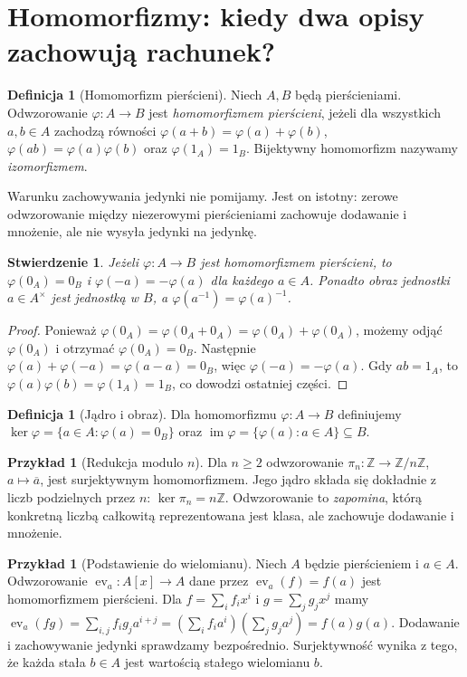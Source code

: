 \documentclass[11pt,a4paper,openany]{report}
\numberwithin{equation}{section}
\theoremstyle{plain}
\newtheorem{stwierdzenie}[twierdzenie]{Stwierdzenie}
\theoremstyle{definition}
\newtheorem{definicja}[twierdzenie]{Definicja}
\newtheorem{przyklad}[twierdzenie]{Przykład}
\theoremstyle{remark}
\newcommand{\Z}{\mathbb Z}
\newcommand{\im}{\operatorname{im}}
\newcommand{\kerf}{\operatorname{ker}}
\newcommand{\ev}{\operatorname{ev}}
\begin{document}
\section{Homomorfizmy: kiedy dwa opisy zachowują rachunek?}

\begin{definicja}[Homomorfizm pierścieni]
Niech $A,B$ będą pierścieniami. Odwzorowanie
$\varphi\colon A\to B$ jest \emph{homomorfizmem pierścieni}, jeżeli dla
wszystkich $a,b\in A$ zachodzą równości
$\varphi(a+b)=\varphi(a)+\varphi(b)$,
$\varphi(ab)=\varphi(a)\varphi(b)$ oraz $\varphi(1_A)=1_B$.
Bijektywny homomorfizm nazywamy \emph{izomorfizmem}.
\end{definicja}

Warunku zachowywania jedynki nie pomijamy. Jest on istotny:
zerowe odwzorowanie między niezerowymi pierścieniami zachowuje dodawanie
i mnożenie, ale nie wysyła jedynki na jedynkę.

\begin{stwierdzenie}
Jeżeli $\varphi\colon A\to B$ jest homomorfizmem pierścieni, to
$\varphi(0_A)=0_B$ i $\varphi(-a)=-\varphi(a)$ dla każdego $a\in A$.
Ponadto obraz jednostki $a\in A^\times$ jest jednostką w $B$,
a $\varphi(a^{-1})=\varphi(a)^{-1}$.
\end{stwierdzenie}
\begin{proof}
Ponieważ $\varphi(0_A)=\varphi(0_A+0_A)
=\varphi(0_A)+\varphi(0_A)$, możemy odjąć $\varphi(0_A)$
i otrzymać $\varphi(0_A)=0_B$.
Następnie $\varphi(a)+\varphi(-a)=\varphi(a-a)=0_B$,
więc $\varphi(-a)=-\varphi(a)$.
Gdy $ab=1_A$, to $\varphi(a)\varphi(b)=\varphi(1_A)=1_B$,
co dowodzi ostatniej części.
\end{proof}

\begin{definicja}[Jądro i obraz]
Dla homomorfizmu $\varphi\colon A\to B$ definiujemy
$\kerf\varphi=\{a\in A:\varphi(a)=0_B\}$ oraz
$\im\varphi=\{\varphi(a):a\in A\}\subseteq B$.
\end{definicja}

\begin{przyklad}[Redukcja modulo $n$]
Dla $n\ge2$ odwzorowanie
$\pi_n\colon\Z\to\Z/n\Z$, $a\mapsto\overline a$, jest
surjektywnym homomorfizmem. Jego jądro składa się dokładnie z liczb
podzielnych przez $n$: $\kerf\pi_n=n\Z$.
Odwzorowanie to \emph{zapomina}, którą konkretną liczbą całkowitą
reprezentowana jest klasa, ale zachowuje dodawanie i mnożenie.
\end{przyklad}

\begin{przyklad}[Podstawienie do wielomianu]
Niech $A$ będzie pierścieniem i $a\in A$. Odwzorowanie
$\ev_a\colon A[x]\to A$ dane przez $\ev_a(f)=f(a)$
jest homomorfizmem pierścieni. Dla $f=\sum_i f_ix^i$ i
$g=\sum_jg_jx^j$ mamy
$\ev_a(fg)=\sum_{i,j}f_ig_ja^{i+j}
=(\sum_if_ia^i)(\sum_jg_ja^j)=f(a)g(a)$.
Dodawanie i zachowywanie jedynki sprawdzamy bezpośrednio.
Surjektywność wynika z tego, że każda stała $b\in A$ jest wartością
stałego wielomianu $b$.
\end{przyklad}
\end{document}
